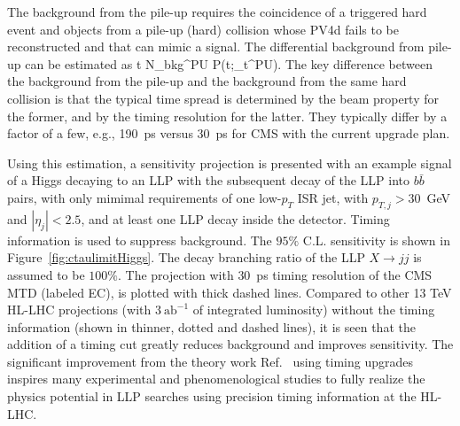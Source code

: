 The background from the pile-up requires the coincidence of a triggered hard event and objects from a pile-up (hard) collision whose PV4d fails to be reconstructed and that can mimic a signal. The differential background from pile-up can be estimated as
\beq
{} {\partial \Delta t} \simeq N_{\rm bkg}^{\rm PU} 
{\mathcal P}(\Delta t;\delta_t^{\rm PU}).
\label{eq:bkgPU}
\eeq
The key difference between the background from the pile-up and the background from the same hard collision is that the typical time spread is determined by the beam property for the former, and by the timing resolution for the latter. They typically differ by a factor of a few, e.g., 190~ps versus 30~ps for CMS with the current upgrade plan. 

Using this estimation, a sensitivity projection is presented with an example signal of a Higgs decaying to an LLP with the subsequent decay of the LLP into $b \bar b$ pairs, with only mimimal requirements of one low-$p_T$ ISR jet, with $p_{T,j} > 30$~GeV and $|\eta_j| < 2.5$, and at least one LLP decay inside the detector. Timing information is used to suppress background. The $95\%$ C.L. sensitivity is shown in Figure~\ref{fig:ctaulimitHiggs}. The decay branching ratio of the LLP $X \to j j$ is assumed to be $100\%$. The projection with $30$~ps timing resolution of the CMS MTD (labeled EC), is plotted with thick dashed lines. Compared to other 13 TeV HL-LHC projections (with $3 ~\text{ab}^{-1}$ of integrated luminosity) without the timing information (shown in thinner, dotted and dashed lines), it is seen that the addition of a timing cut greatly reduces background and improves sensitivity. The significant improvement from the theory work Ref.~\cite{Liu:2018wte} using timing upgrades inspires many experimental and phenomenological studies to fully realize the physics potential in LLP searches using precision timing information at the HL-LHC. 


